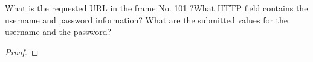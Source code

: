 \documentclass[../../main.tex]{subfiles}
\begin{document}
\begin{wts}
What is the requested URL in the frame No. 101 ?What HTTP field contains the username and password information? What are the submitted values for the username and the password?
\end{wts}
\begin{proof}

\end{proof}
\end{document}
